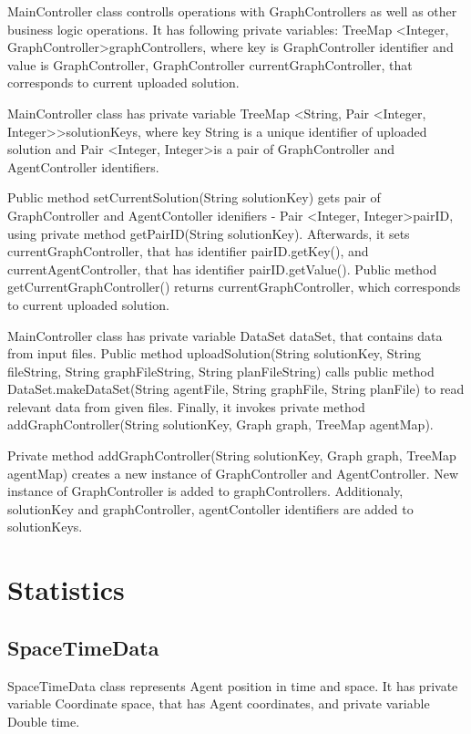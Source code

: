 \documentclass[thesis=B,english]{FITthesis}[2019/12/23]
\begin{document}
MainController class controlls operations with GraphControllers as well as other business logic operations. It has following private variables: TreeMap \textless Integer, GraphController\textgreater graphControllers, where key is GraphController identifier and value is GraphController,  GraphController currentGraphController, that corresponds to current uploaded solution.

MainController class has private variable TreeMap \textless String, Pair \textless Integer, Integer\textgreater\textgreater   solutionKeys, where key String is a unique identifier of uploaded solution and Pair \textless Integer, Integer\textgreater is a pair of GraphController and AgentController identifiers.

Public method setCurrentSolution(String solutionKey) gets pair of GraphController and AgentContoller idenifiers - Pair \textless Integer, Integer\textgreater pairID, using private method getPairID(String solutionKey). Afterwards, it sets currentGraphController, that has identifier pairID.getKey(), and currentAgentController, that has identifier pairID.getValue(). Public method getCurrentGraphController() returns currentGraphController, which corresponds to current uploaded solution.

MainController class has private variable DataSet dataSet, that contains data from input files. Public method uploadSolution(String solutionKey, String fileString, String graphFileString, String planFileString) calls public method DataSet.makeDataSet(String agentFile, String graphFile, String planFile) to read relevant data from given files. Finally, it invokes private method addGraphController(String solutionKey, Graph graph, TreeMap  agentMap).

Private method addGraphController(String solutionKey, Graph graph, TreeMap  agentMap) creates a new instance of GraphController and AgentController. New instance of GraphController is added to graphControllers. Additionaly, solutionKey and graphController, agentContoller identifiers are added to solutionKeys.

\section{Statistics}

\subsection{SpaceTimeData}

SpaceTimeData class represents Agent position in time and space. It has private variable Coordinate space, that has Agent coordinates, and private variable Double time.
\end{document}
